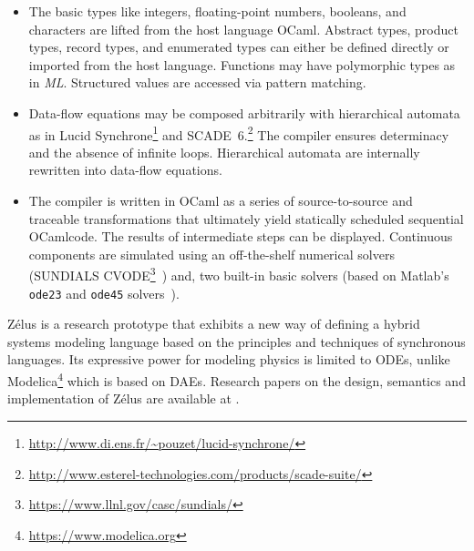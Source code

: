 \documentclass[11pt,titlepage,twoside]{report}
\newenvironment{flatitemize}
  {\begin{itemize}[leftmargin=*]}
  {\end{itemize}}
\newcommand{\zelus}{{\sf Z\'elus}}
\newcommand{\lucy}{{\sf Lucid Synchrone}}
\newcommand{\modelica}{{\sf Modelica}}
\newcommand{\scadesix}{{\sf SCADE~6}}
\newcommand{\ocaml}{{\sf OCaml}}
\begin{document}
\begin{flatitemize}
\begin{quote}
A clock is termed \emph{discrete} if it has been so declared or if it 
results from the sub-sampling a discrete clock or a zero-crossing.
Otherwise, it is termed \emph{continuous}.
\end{quote}

It is possible to reset a continuous variable defined by an \ac{ODE}
on a discrete clock.
A \emph{zero-crossing} occurs when a continuous-time signal crosses zero 
from a negative value to a positive one during integration.
Conceptually, a \emph{timer} is a particular case of a zero-crossing event, 
even if the actual implementation is more specific.

\item
  The basic types like integers, floating-point numbers, booleans, and
  characters are lifted from the host language \ocaml.  Abstract types,
  product types, record types, and enumerated types can either be
  defined directly or imported from the host language. Functions may have 
  polymorphic types as in \emph{ML}.
  Structured values are accessed via pattern matching.

\item
Data-flow equations may be composed arbitrarily with hierarchical automata 
as in \lucy\footnote{\url{http://www.di.ens.fr/~pouzet/lucid-synchrone/}}
and
\scadesix.\footnote{\url{http://www.esterel-technologies.com/products/scade-suite/}}
The compiler ensures determinacy and the absence of infinite loops.
Hierarchical automata are internally rewritten into data-flow equations.

\item
The compiler is written in \ocaml{} as a series of
source-to-source and traceable transformations that ultimately yield
statically scheduled sequential \ocaml code.
The results of intermediate steps can be displayed.
Continuous components are simulated using an off-the-shelf
numerical solvers (SUNDIALS
CVODE\footnote{\url{https://www.llnl.gov/casc/sundials/}}~\cite{sundials:2005})
and, two built-in basic solvers (based on Matlab's \texttt{ode23} and
\texttt{ode45} solvers~\cite{ShampineGlaTho:ODEsMatlab:2003}).
\end{flatitemize}

\zelus{} is a research prototype that exhibits a new way of
defining a hybrid systems modeling language based on
the principles and techniques of synchronous languages.
Its expressive power for modeling physics is limited to \acp{ODE}, unlike 
\modelica\footnote{\url{https://www.modelica.org}} which is based on 
\acp{DAE}.
Research papers on the design, semantics and implementation of \zelus{} are 
available at .
\end{document}
